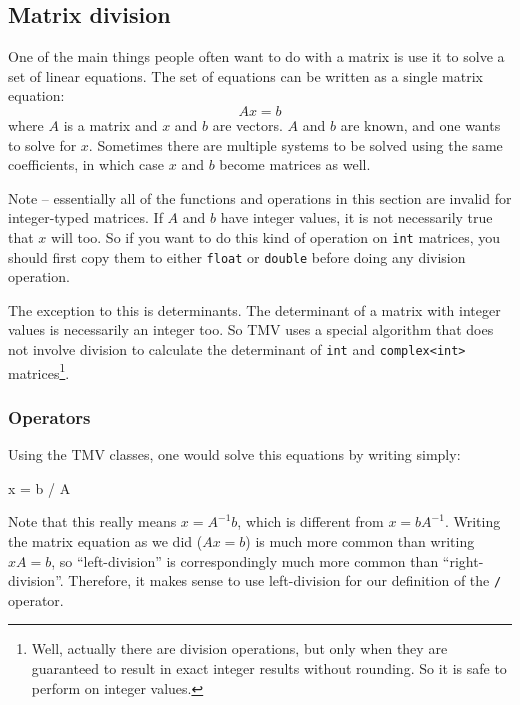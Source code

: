 \documentclass[twoside,letterpaper,11pt]{article}
\renewcommand{\tt}[1]{{\lstinline {#1}}}
\begin{document}
\subsection{Matrix division}
\label{Matrix_Division}

One of the main things people often want to do with a matrix is use it to solve a 
set of linear equations.  The set of equations can be written as a single matrix
equation:
\begin{equation*}
\nonumber
A x = b
\end{equation*}
where $A$ is a matrix and $x$ and $b$ are vectors.  $A$ and $b$ are known, 
and one wants to solve for $x$.  Sometimes there are
multiple systems to be solved using the same coefficients, in which case
$x$ and $b$ become matrices as well.

Note -- essentially all of the functions and operations in this section are invalid for
integer-typed matrices.  If $A$ and $b$ have integer values, it is not necessarily
true that $x$ will too.  So if you want to do this kind of operation on \tt{int} matrices,
you should first copy them to either \tt{float} or \tt{double} before doing any division
operation.  

The exception to this is determinants.  The determinant of a matrix with integer values
is necessarily an integer too.  So TMV uses a special algorithm that does not involve
division to calculate the determinant of \tt{int} and \tt{complex<int>} matrices\footnote{
Well, actually there are division operations, but only when they are guaranteed to 
result in exact integer results without rounding.  So it is safe to perform on integer values.}.

\subsubsection{Operators}
\label{Matrix_Division_Operators}

Using the TMV classes, one would solve this equations by writing simply:
\begin{tmvcode}
x = b / A
\end{tmvcode}
Note that this really means $x = A^{-1} b$, which is different from $x = b A^{-1}$.
Writing the matrix equation as we did ($A x=b$) is much more common than 
writing $xA=b$, so ``left-division'' is correspondingly much more common than 
``right-division''.  Therefore, it makes sense to use left-division for our definition of the \tt{/}
operator.
\end{document}
